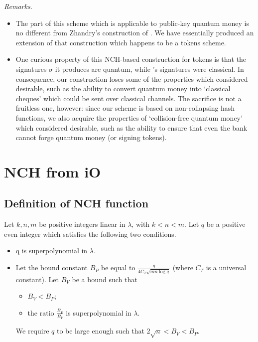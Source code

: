 \documentclass{article}
\begin{document}
\noindent \textit{Remarks.}
\begin{itemize}
    \item The part of this scheme which is applicable to public-key quantum money is no different from Zhandry's construction of \cite{zha17}. We have essentially produced an extension of that construction which happens to be a tokens scheme.
    \item One curious property of this NCH-based construction for tokens is that the signatures $\sigma$ it produces are quantum, while \cite{tokens}'s signatures were classical. In consequence, our construction loses some of the properties which \cite{tokens} considered desirable, such as the ability to convert quantum money into `classical cheques' which could be sent over classical channels. The sacrifice is not a fruitless one, however: since our scheme is based on non-collapsing hash functions, we also acquire the properties of `collision-free quantum money' which \cite{zha17} considered desirable, such as the ability to ensure that even the bank cannot forge quantum money (or signing tokens).
\end{itemize}

\clearpage

\section{NCH from iO}

\subsection{Definition of NCH function}
\label{section:defnch}

Let $k, n, m$ be positive integers linear in $\lambda$, with $k < n < m$. Let $q$ be a positive even integer which satisfies the following two conditions.
\begin{itemize}
	\item q is superpolynomial in $\lambda$.
	\item Let the bound constant $B_P$ be equal to $\frac{q}{4C_T \sqrt{mn \log q}}$ (where $C_T$ is a universal constant). Let $B_V$ be a bound such that
		\begin{itemize}
			\item $B_V < B_P$;
			\item the ratio $\frac{B_P}{B_V}$ is superpolynomial in $\lambda$.
		\end{itemize}
		We require $q$ to be large enough such that $2\sqrt{n} < B_V < B_P$.
\end{itemize}
\end{document}
